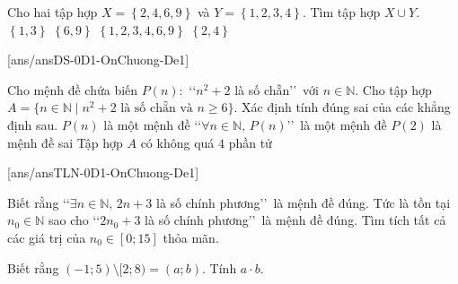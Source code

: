 \begin{ex}%
Cho hai tập hợp $X=\left\{ 2, 4, 6, 9 \right\}$ và $Y=\left\{ 1, 2, 3, 4 \right\}$. Tìm tập hợp $X \cup Y$.
\choice
{$\left\{1, 3 \right\}$	}
{$\left\{6, 9 \right\}$}
{\True $\left\{1, 2, 3, 4, 6, 9 \right\}$}
{$\left\{2, 4 \right\}$}
\end{ex}
\TNTF
[ans/ansDS-0D1-OnChuong-De1]
\begin{ex}%
Cho mệnh đề chứa biến $P(n):$ \lq\lq $n^2+2$ là số chẵn\rq\rq\, với $n\in\mathbb{N}$. Cho tập hợp $A=\{n\in \mathbb{N} \mid n^2+2 \text{ là số chẵn và } n\ge6 \}$. Xác định tính đúng sai của các khẳng định sau.
\choiceTF
{$P(n)$ là một mệnh đề}
{\True \lq\lq $\forall n\in\mathbb{N},\, P(n)$\rq\rq\, là một mệnh đề}
{$P(2)$ là mệnh đề sai}
{\True Tập hợp $A$ có không quá $4$ phần tử}
\end{ex}
\TNSA
[ans/ansTLN-0D1-OnChuong-De1]
\begin{ex}%
Biết rằng \lq\lq $\exists n\in\mathbb{N},\, 2n+3$ là số chính phương\rq\rq\, là mệnh đề đúng. Tức là tồn tại $n_0\in \mathbb{N}$ sao cho \lq\lq $2n_0+3$ là số chính phương\rq\rq\, là mệnh đề đúng. Tìm tích tất cả các giá trị của $n_0\in [0;15]$ thỏa mãn.
\end{ex}

\begin{ex}%
Biết rằng  $(-1;5)\setminus[2;8) =(a;b)$. Tính $a\cdot b$.
\loigiai{
Ta có $(-1;5)\setminus[2;8)=(-1;2)$.
}
\end{ex}

